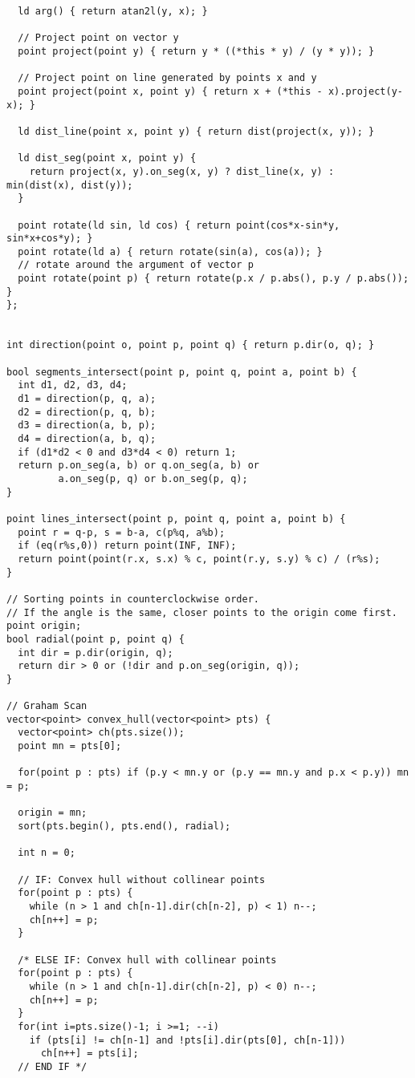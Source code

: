\documentclass[12pt,a4paper,onesided]{article}
\begin{document}
\begin{multicols}{3}
\begin{lstlisting}
  ld arg() { return atan2l(y, x); }

  // Project point on vector y
  point project(point y) { return y * ((*this * y) / (y * y)); }

  // Project point on line generated by points x and y
  point project(point x, point y) { return x + (*this - x).project(y-x); }

  ld dist_line(point x, point y) { return dist(project(x, y)); }

  ld dist_seg(point x, point y) {
    return project(x, y).on_seg(x, y) ? dist_line(x, y) :  min(dist(x), dist(y));
  }

  point rotate(ld sin, ld cos) { return point(cos*x-sin*y, sin*x+cos*y); }
  point rotate(ld a) { return rotate(sin(a), cos(a)); }
  // rotate around the argument of vector p
  point rotate(point p) { return rotate(p.x / p.abs(), p.y / p.abs()); }
};


int direction(point o, point p, point q) { return p.dir(o, q); }

bool segments_intersect(point p, point q, point a, point b) {
  int d1, d2, d3, d4;
  d1 = direction(p, q, a);
  d2 = direction(p, q, b);
  d3 = direction(a, b, p);
  d4 = direction(a, b, q);
  if (d1*d2 < 0 and d3*d4 < 0) return 1;
  return p.on_seg(a, b) or q.on_seg(a, b) or
         a.on_seg(p, q) or b.on_seg(p, q);
}

point lines_intersect(point p, point q, point a, point b) {
  point r = q-p, s = b-a, c(p%q, a%b);
  if (eq(r%s,0)) return point(INF, INF);
  return point(point(r.x, s.x) % c, point(r.y, s.y) % c) / (r%s);
}

// Sorting points in counterclockwise order.
// If the angle is the same, closer points to the origin come first.
point origin;
bool radial(point p, point q) {
  int dir = p.dir(origin, q);
  return dir > 0 or (!dir and p.on_seg(origin, q));
}

// Graham Scan
vector<point> convex_hull(vector<point> pts) {
  vector<point> ch(pts.size());
  point mn = pts[0];

  for(point p : pts) if (p.y < mn.y or (p.y == mn.y and p.x < p.y)) mn = p;

  origin = mn;
  sort(pts.begin(), pts.end(), radial);

  int n = 0;

  // IF: Convex hull without collinear points
  for(point p : pts) {
    while (n > 1 and ch[n-1].dir(ch[n-2], p) < 1) n--;
    ch[n++] = p;
  }

  /* ELSE IF: Convex hull with collinear points
  for(point p : pts) {
    while (n > 1 and ch[n-1].dir(ch[n-2], p) < 0) n--;
    ch[n++] = p;
  }
  for(int i=pts.size()-1; i >=1; --i)
    if (pts[i] != ch[n-1] and !pts[i].dir(pts[0], ch[n-1]))
      ch[n++] = pts[i];
  // END IF */


\end{lstlisting}
\end{multicols}
\end{document}
